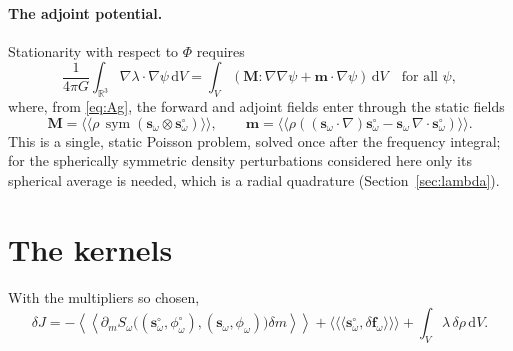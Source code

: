 \documentclass[11pt,a4paper]{article}
\newcommand{\bs}{\mathbf{s}}
\newcommand{\bM}{\mathbf{M}}
\newcommand{\vm}{\mathbf{m}}
\newcommand{\sd}{\mathbf{s}^\circ}
\newcommand{\pd}{\phi^\circ}
\newcommand{\sym}{\operatorname{sym}}
\newcommand{\dd}{\,\mathrm{d}}
\theoremstyle{remark}
\begin{document}
\paragraph{The adjoint potential.}
Stationarity with respect to $\Phi$ requires
\begin{equation}
  \frac{1}{4\pi G}\int_{\mathbb{R}^3}\nabla\lambda\cdot\nabla\psi\dd V =
  \int_V\left(\bM:\nabla\nabla\psi + \vm\cdot\nabla\psi\right)\dd V
  \quad\text{for all } \psi, \label{eq:lambda}
\end{equation}
where, from \eqref{eq:Ag}, the forward and adjoint fields enter through the
static fields
\begin{equation}
  \bM = \langle\!\langle\rho\,\sym(\bs_\omega\otimes\sd_\omega)
  \rangle\!\rangle, \qquad
  \vm = \langle\!\langle\rho\left((\bs_\omega\cdot\nabla)\sd_\omega -
  \bs_\omega\,\nabla\cdot\sd_\omega\right)\rangle\!\rangle.
  \label{eq:sources}
\end{equation}
This is a single, static Poisson problem, solved once after the frequency
integral; for the spherically symmetric density perturbations considered
here only its spherical average is needed, which is a radial quadrature
(Section~\ref{sec:lambda}).

\section{The kernels}

With the multipliers so chosen,
\begin{equation}
  \delta J = -\left\langle\!\!\left\langle\partial_mS_\omega
  \big((\sd_\omega,\pd_\omega),(\bs_\omega,\phi_\omega)\big)\delta m
  \right\rangle\!\!\right\rangle + \langle\!\langle\langle\sd_\omega,
  \delta\mathbf{f}_\omega\rangle\rangle\!\rangle + \int_V\lambda\,\delta\rho
  \dd V. \label{eq:gradient}
\end{equation}
\end{document}
